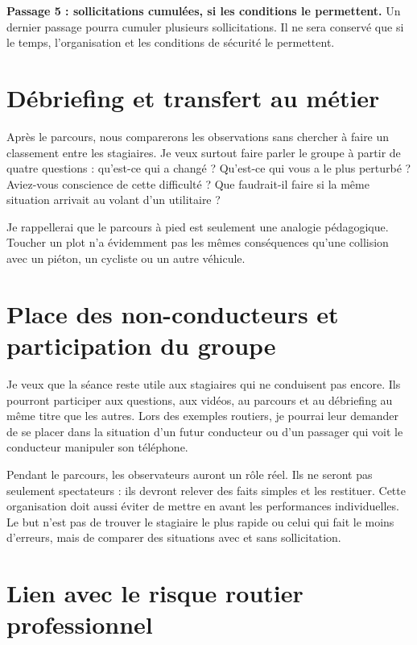 \textbf{Passage 5 : sollicitations cumulées, si les conditions le permettent.} Un dernier passage pourra cumuler plusieurs sollicitations. Il ne sera conservé que si le temps, l’organisation et les conditions de sécurité le permettent.

\begingroup\color{red}
\section{Débriefing et transfert au métier}

Après le parcours, nous comparerons les observations sans chercher à faire un classement entre les stagiaires. Je veux surtout faire parler le groupe à partir de quatre questions : qu’est-ce qui a changé ? Qu’est-ce qui vous a le plus perturbé ? Aviez-vous conscience de cette difficulté ? Que faudrait-il faire si la même situation arrivait au volant d’un utilitaire ?

Je rappellerai que le parcours à pied est seulement une analogie pédagogique. Toucher un plot n’a évidemment pas les mêmes conséquences qu’une collision avec un piéton, un cycliste ou un autre véhicule.

\endgroup

\begingroup\color{red}
\section{Place des non-conducteurs et participation du groupe}

Je veux que la séance reste utile aux stagiaires qui ne conduisent pas encore. Ils pourront participer aux questions, aux vidéos, au parcours et au débriefing au même titre que les autres. Lors des exemples routiers, je pourrai leur demander de se placer dans la situation d’un futur conducteur ou d’un passager qui voit le conducteur manipuler son téléphone.

Pendant le parcours, les observateurs auront un rôle réel. Ils ne seront pas seulement spectateurs : ils devront relever des faits simples et les restituer. Cette organisation doit aussi éviter de mettre en avant les performances individuelles. Le but n’est pas de trouver le stagiaire le plus rapide ou celui qui fait le moins d’erreurs, mais de comparer des situations avec et sans sollicitation.

\endgroup

\section{Lien avec le risque routier professionnel}

